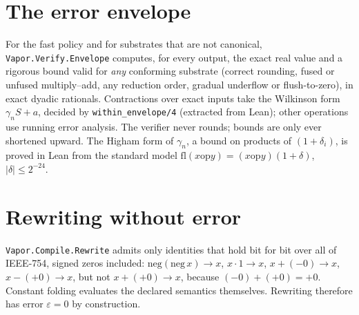 \section{The error envelope}

For the fast policy and for substrates that are not canonical, \texttt{Vapor.Verify.Envelope} computes,
for every output, the exact real value and a rigorous bound valid for \emph{any} conforming substrate
(correct rounding, fused or unfused multiply--add, any reduction order, gradual underflow or
flush-to-zero), in exact dyadic rationals. Contractions over exact inputs take the Wilkinson form
$\gamma_n S + a$, decided by \texttt{within\_envelope/4} (extracted from Lean); other operations use
running error analysis. The verifier never rounds; bounds are only ever shortened upward. The Higham
form of $\gamma_n$, a bound on products of $(1+\delta_i)$, is proved in Lean from the standard model
$\mathrm{fl}(x \mathbin{\mathrm{op}} y) = (x \mathbin{\mathrm{op}} y)(1+\delta)$, $|\delta| \le 2^{-24}$.

\section{Rewriting without error}

\texttt{Vapor.Compile.Rewrite} admits only identities that hold bit for bit over all of IEEE-754,
signed zeros included: $\mathrm{neg}(\mathrm{neg}\,x) \to x$, $x\cdot 1 \to x$, $x + (-0) \to x$,
$x - (+0) \to x$, but not $x + (+0) \to x$, because $(-0) + (+0) = +0$. Constant folding evaluates the
declared semantics themselves. Rewriting therefore has error $\varepsilon = 0$ by construction.
